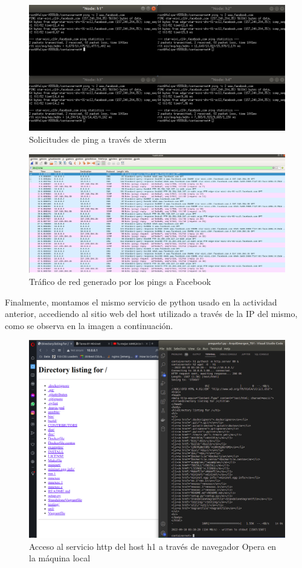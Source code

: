 \documentclass[10pt]{article}
\begin{document}
\begin{figure}[H]
    \centering
    \includegraphics[width=0.9\linewidth]{Imagenes/item03_ping_facebook_terminal.png}
    \caption{Solicitudes de ping a través de xterm}
    \label{fig:item03_piing_xterm}
\end{figure}

\begin{figure}[H]
    \centering
    \includegraphics[width=\linewidth]{Imagenes/item03_ping_facebook.png}
    \caption{Tráfico de red generado por los pings a Facebook}
    \label{fig:item03_ping_wireshark}
\end{figure}

Finalmente, montamos el mismo servicio de python usado en la actividad anterior, accediendo al sitio web del host utilizado a través de la IP del mismo, como se observa en la imagen a continuación.

\begin{figure}[H]
    \centering
    \includegraphics[width=0.9\linewidth]{Imagenes/item03_Directory.png}
    \caption{Acceso al servicio http del host h1 a través de navegador Opera en la máquina local}
    \label{fig:item03_direcotry}
\end{figure}
\end{document}
